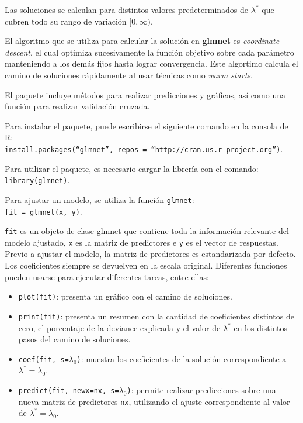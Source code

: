 \documentclass[a4paper,12pt]{report}
\begin{document}
Las soluciones se calculan para distintos valores predeterminados de \(\lambda^*\) que cubren todo su rango de variación $[0, \infty)$.

El algoritmo que se utiliza para calcular la solución en \textbf{glmnet} es \textit{coordinate descent}, el cual optimiza sucesivamente la función objetivo sobre cada parámetro manteniendo a los demás fijos hasta lograr convergencia. Este algortimo calcula el camino de soluciones rápidamente al usar técnicas como \textit{warm starts}. 

El paquete incluye métodos para realizar predicciones y gráficos, así como una función para realizar validación cruzada.

Para instalar el paquete, puede escribirse el siguiente comando en la consola de R: \\ \texttt{install.packages(``glmnet'', repos = ``http://cran.us.r-project.org'')}.


Para utilizar el paquete, es necesario cargar la librería con el comando: \\
\texttt{library(glmnet)}.

Para ajustar un modelo, se utiliza la función \texttt{glmnet}: \\
\texttt{fit = glmnet(x, y)}.

\texttt{fit} es un objeto de clase glmnet que contiene toda la información relevante del modelo ajustado, \texttt{x} es la matriz de predictores e \texttt{y} es el vector de respuestas. Previo a ajustar el modelo, la matriz de predictores es estandarizada por defecto. Los coeficientes siempre se devuelven en la escala original. Diferentes funciones pueden usarse para ejecutar diferentes tareas, entre ellas:

\begin{itemize}
\item \texttt{plot(fit)}: presenta un gráfico con el camino de soluciones.
\item \texttt{print(fit)}: presenta un resumen con la cantidad de coeficientes distintos de cero, el porcentaje de la deviance explicada y el valor de $\lambda^*$ en los distintos pasos del camino de soluciones.
\item \texttt{coef(fit, s=$\lambda_0$)}: muestra los coeficientes de la solución correspondiente a ${\lambda^*=\lambda_0}$.
\item \texttt{predict(fit, newx=nx, s=$\lambda_0$)}: permite realizar predicciones sobre una nueva matriz de predictores \texttt{nx}, utilizando el ajuste correspondiente al valor de $\lambda^*=\lambda_0$. 
\end{itemize} 
\end{document}
